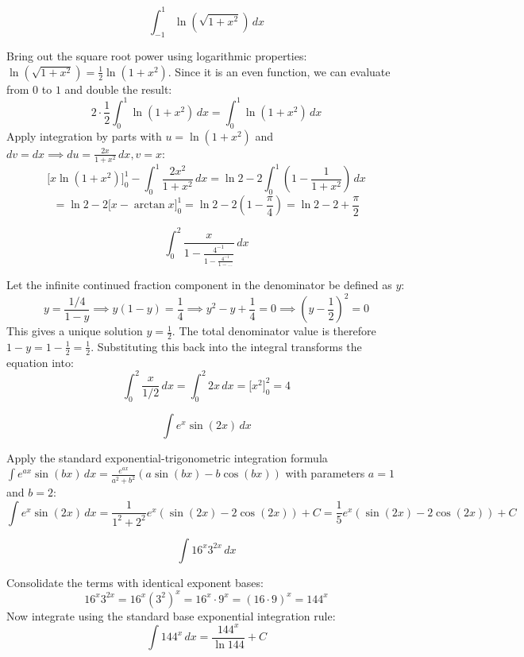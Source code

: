 \begin{questions}
    \question \[ \int_{-1}^1 \ln\left(\sqrt{1+x^2}\right) \,dx \]
    \begin{solution}
        Bring out the square root power using logarithmic properties: $\ln\left(\sqrt{1+x^2}\right) = \frac{1}{2}\ln(1+x^2)$. Since it is an even function, we can evaluate from $0$ to $1$ and double the result:
        \[ 2 \cdot \frac{1}{2} \int_0^1 \ln(1+x^2) \,dx = \int_0^1 \ln(1+x^2) \,dx \]
        Apply integration by parts with $u = \ln(1+x^2)$ and $dv = dx \implies du = \frac{2x}{1+x^2} \,dx, v = x$:
        \[ \Big[ x\ln(1+x^2) \Big]_0^1 - \int_0^1 \frac{2x^2}{1+x^2} \,dx = \ln 2 - 2\int_0^1 \left(1 - \frac{1}{1+x^2}\right) \,dx \]
        \[ = \ln 2 - 2 \Big[ x - \arctan x \Big]_0^1 = \ln 2 - 2\left(1 - \frac{\pi}{4}\right) = \ln 2 - 2 + \frac{\pi}{2} \]
    \end{solution}

    \question \[ \int_0^2 \frac{x}{1 - \frac{4^{-1}}{1 - \frac{4^{-1}}{1 - \dots}}} \,dx \]
    \begin{solution}
        Let the infinite continued fraction component in the denominator be defined as $y$:
        \[ y = \frac{1/4}{1-y} \implies y(1-y) = \frac{1}{4} \implies y^2 - y + \frac{1}{4} = 0 \implies \left(y - \frac{1}{2}\right)^2 = 0 \]
        This gives a unique solution $y = \frac{1}{2}$. The total denominator value is therefore $1 - y = 1 - \frac{1}{2} = \frac{1}{2}$. 
        Substituting this back into the integral transforms the equation into:
        \[ \int_0^2 \frac{x}{1/2} \,dx = \int_0^2 2x \,dx = \Big[ x^2 \Big]_0^2 = 4 \]
    \end{solution}

    \question \[ \int e^x \sin(2x) \,dx \]
    \begin{solution}
        Apply the standard exponential-trigonometric integration formula $\int e^{ax}\sin(bx) \,dx = \frac{e^{ax}}{a^2+b^2}(a\sin(bx) - b\cos(bx))$ with parameters $a=1$ and $b=2$:
        \[ \int e^x \sin(2x) \,dx = \frac{1}{1^2+2^2}e^x(\sin(2x) - 2\cos(2x)) + C = \frac{1}{5}e^x(\sin(2x) - 2\cos(2x)) + C \]
    \end{solution}

    \question \[ \int 16^x 3^{2x} \,dx \]
    \begin{solution}
        Consolidate the terms with identical exponent bases:
        \[ 16^x 3^{2x} = 16^x (3^2)^x = 16^x \cdot 9^x = (16 \cdot 9)^x = 144^x \]
        Now integrate using the standard base exponential integration rule:
        \[ \int 144^x \,dx = \frac{144^x}{\ln 144} + C \]
    \end{solution}


\end{questions}
